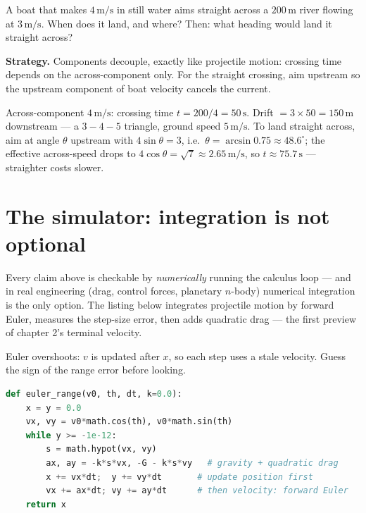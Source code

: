 \begin{example}\label{ex:river}
A boat that makes $4\,\mathrm{m/s}$ in still water aims straight across a
$200\,\mathrm{m}$ river flowing at $3\,\mathrm{m/s}$. When does it land, and
where? Then: what heading would land it straight across?
\par\smallskip
\textbf{Strategy.} Components decouple, exactly like projectile motion:
crossing time depends on the across-component only. For the straight
crossing, aim upstream so the upstream component of boat velocity cancels
the current.
\begin{solution}
Across-component $4\,\mathrm{m/s}$: crossing time $t=200/4=50\,\mathrm{s}$.
Drift $=3\times50=150\,\mathrm{m}$ downstream --- a
$3{-}4{-}5$ triangle, ground speed $5\,\mathrm{m/s}$. To land straight
across, aim at angle $\theta$ upstream with $4\sin\theta=3$, i.e.\
$\theta=\arcsin0.75\approx48.6^{\circ}$; the effective across-speed drops
to $4\cos\theta=\sqrt{7}\approx2.65\,\mathrm{m/s}$, so
$t\approx75.7\,\mathrm{s}$ --- straighter costs slower. \checkmark
\end{solution}
\end{example}

\section{The simulator: integration is not optional}\label{sec:kin-code}

Every claim above is checkable by \emph{numerically} running the calculus
loop --- and in real engineering (drag, control forces, planetary $n$-body)
numerical integration is the only option. The listing below integrates
projectile motion by forward Euler, measures the step-size error, then adds
quadratic drag --- the first preview of chapter 2's terminal velocity.

\begin{checkpoint}
Euler overshoots: $v$ is updated after $x$, so each step uses a stale
velocity. Guess the sign of the range error before looking.
\end{checkpoint}

\begin{lstlisting}[language=Python,caption={\texttt{code/ch01\_projectile.py} --- Euler integration vs closed form, then with quadratic drag.},label={lst:proj}]
def euler_range(v0, th, dt, k=0.0):
    x = y = 0.0
    vx, vy = v0*math.cos(th), v0*math.sin(th)
    while y >= -1e-12:
        s = math.hypot(vx, vy)
        ax, ay = -k*s*vx, -G - k*s*vy   # gravity + quadratic drag
        x += vx*dt;  y += vy*dt       # update position first
        vx += ax*dt; vy += ay*dt      # then velocity: forward Euler
    return x
\end{lstlisting}

